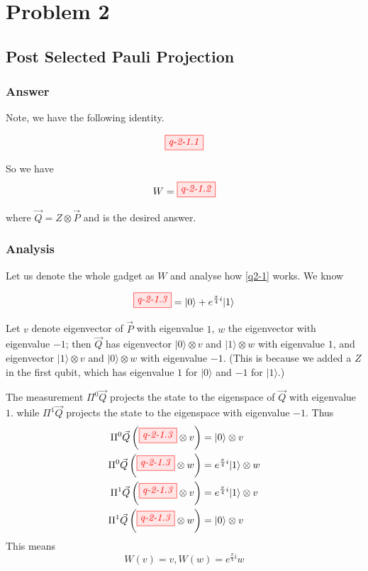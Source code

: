 \section{Problem 2}

\subsection{Post Selected Pauli Projection}

\subsubsection{Answer}


Note, we have the following identity.

\begin{align*}
	\tikzfig{q-2-1.1} 
\end{align*}

So we have 
\begin{equation}\label{q2-1}
	W=\tikzfig{q-2-1.2}
\end{equation}

where $\vec{Q} = Z \otimes \vec{P}$ and is the desired answer.


\subsubsection{Analysis}

Let us denote the whole gadget as $W$ and analyse how \eqref{q2-1} works.
We know

$$
\tikzfig{q-2-1.3} = |0\rangle + e^{\frac{\pi}{4}i} |1\rangle
$$

Let $v$ denote eigenvector of $\vec{P}$ with eigenvalue $1$, $w$ the eigenvector with eigenvalue $-1$; then $\vec{Q}$ has eigenvector $|0\rangle \otimes v$ and $|1\rangle \otimes w$ with eigenvalue $1$, and eigenvector $|1\rangle \otimes v$ and $|0\rangle \otimes w$ with eigenvalue $-1$. 
(This is because we added a $Z$ in the first qubit, which has eigenvalue $1$ for $|0\rangle$ and $-1$ for $|1\rangle$.)

The measurement $\Pi^0 \vec{Q}$ projects the state to the eigenspace of $\vec{Q}$ with eigenvalue $1$. 
while $\Pi^1 \vec{Q}$ projects the state to the eigenspace with eigenvalue $-1$.
Thus
\begin{equation}\label{q2-1-cal}
\begin{split}
	\Pi^0 \vec{Q} \left( \tikzfig{q-2-1.3} \otimes v \right) &= |0\rangle \otimes v \\
	\Pi^0 \vec{Q} \left( \tikzfig{q-2-1.3} \otimes w \right) &= e^{\frac{\pi}{4}i}|1\rangle \otimes w \\
	\Pi^1 \vec{Q} \left( \tikzfig{q-2-1.3} \otimes v \right) &= e^{\frac{\pi}{4}i}|1\rangle \otimes v \\
	\Pi^1 \vec{Q} \left( \tikzfig{q-2-1.3} \otimes w \right) &= |0\rangle \otimes v 
\end{split}
\end{equation}
This means
$$
W(v) = v, W(w) = e^{\frac{\pi}{4}i} w
$$


